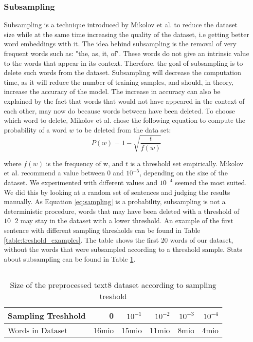 \subsubsection{Subsampling}
Subsampling is a technique introduced by Mikolov et al. \cite{mikolov} to reduce the dataset size while at the same time increasing the quality of the dataset, i.e getting better word embeddings with it. The idea behind subsampling is the removal of very frequent words such as: "the, as, it, of". These words do not give an intrinsic value to the words that appear in its context. Therefore, the goal of subsampling is to delete such words from the dataset. Subsampling will decrease the computation time, as it will reduce the number of training samples, and should, in theory, increase the accuracy of the model. The increase in accuracy can also be explained by the fact that words that would not have appeared in the context of each other, may now do because words between have been deleted.
To choose which word to delete, Mikolov et al. \cite{mikolov2} chose the following equation to compute the probability of a word $w$  to be deleted from the data set:
\begin{equation} \label{eq:sampling}
P(w) = 1- \sqrt{{\frac{t}{f(w)}}}
\end{equation}

where $f(w)$ is the frequency of w, and $t$ is a threshold set empirically. Mikolov et al. recommend a value between $0$ and $10^{-5}$, depending on the size of the dataset. We experimented with different values and $10^{-4}$ seemed the most suited. We did this by looking at a random set of sentences and judging the results manually. 
As Equation \ref{eq:sampling} is a probability, subsampling is not a deterministic procedure, words that may have been deleted with a threshold of $10^-2$ may stay in the dataset with a lower threshold. An example of the first sentence with different sampling thresholds can be found in Table \ref{table:treshold_examples}. The table shows the first 20 words of our dataset, without the words that were subsampled according to a threshold sample. Stats about subsampling can be found in Table \ref{table:treshold}.
\begin{table}[h]
\centering
\begin{tabular}{|l|l|l|l|l|l|}
\hline
\end{tabular}

\label{table:treshold}
\end{table}

\begin{table}[tb]
\caption{Size of the preprocessed text8 dataset according to sampling treshold}
    \begin{tabular}{l r r r r r}%
        \toprule
Sampling Treshhold & 0 & $ 10^{-1}$&$ 10^{-2}$& $10^{-3} $ &$10^{-4} $ \\ 
        \midrule%
Words in Dataset  & 16mio & 15mio & 11mio & 8mio & 4mio \\ 
        \bottomrule%
   \end{tabular}%
   \label{table:with_20}%
\end{table}

